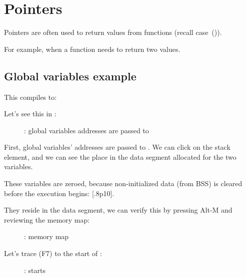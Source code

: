 \section{Pointers}
\myindex{\CLanguageElements!\Pointers}
\label{label_pointers}

Pointers are often used to return values from functions (recall \scanf case~()).

For example, when a function needs to return two values.

\subsection{Global variables example}



This compiles to:



\myindex{\olly}
\clearpage
Let's see this in \olly:

\begin{figure}[H]
\centering
{}
\caption{\olly: 
global variables addresses are passed to \ttfone}
\label{fig:pointers_olly_global_1}
\end{figure}

First, global variables' addresses are passed to \ttfone.
We can click  
on the stack element, and we can see the place in the data segment allocated 
for the two variables.

\clearpage
These variables are zeroed, because non-initialized data (from \ac{BSS}) is cleared before
the execution begins: [.8p10].

They reside in the data segment, we can verify this by pressing Alt-M and reviewing the memory map:

\begin{figure}[H]
\centering
{}
\caption{\olly: memory map}
\label{fig:pointers_olly_global_5}
\end{figure}

\clearpage
Let's trace (F7) to the start of \ttfone: 

\begin{figure}[H]
\centering
{}
\caption{\olly: \ttfone starts}
\label{fig:pointers_olly_global_2}
\end{figure}

